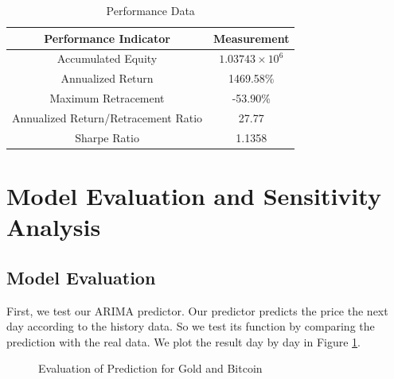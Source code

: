 \documentclass[12pt,a4paper]{article}
\newcommand{\Predictor}{ARIMA }
\begin{document}
\begin{spacing}{1.2}
\begin{table}[H]
	\renewcommand{\arraystretch}{1.5}
	\caption{Performance Data}
	\label{table:performance}
	\begin{center}
		{\footnotesize
			\begin{tabular}{c c }
				\toprule
				Performance Indicator & Measurement\\
				\midrule
				Accumulated Equity & $1.03743 \times 10^6$ \\
				Annualized Return & 1469.58\% \\
				Maximum Retracement & -53.90\% \\
				Annualized Return/Retracement Ratio & 27.77 \\
				Sharpe Ratio & 1.1358 \\
				\bottomrule
		\end{tabular}}
	\end{center}	
\end{table}



\section{Model Evaluation and Sensitivity Analysis}
\label{SensitivityAnalysis}

\subsection{Model Evaluation}

First, we test our \Predictor predictor. Our predictor predicts the price the next day according to the history data. So we test its function by comparing the prediction with the real data. We plot the result day by day in Figure \ref{fig:pred_evaluation}. 

\begin{figure}
	\begin{center}
		\caption{Evaluation of Prediction for Gold and Bitcoin}
		\label{fig:pred_evaluation}
	\end{center}
\end{figure}



\end{spacing}
\end{document}
